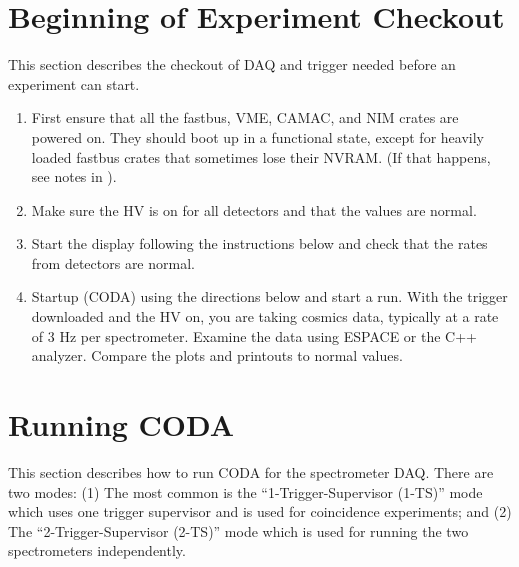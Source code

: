 {\section{Beginning of Experiment Checkout}

\par
This section describes the 
checkout of DAQ and trigger
needed before an experiment can start.

\begin{enumerate}
\item{First ensure that all the fastbus, VME,
CAMAC, and NIM crates are powered
on. They should
boot up in a functional state, except for
heavily loaded fastbus crates that sometimes
lose their NVRAM.  (If that happens, see notes
in ).}


\item{Make sure the HV is on for all detectors
and that the values are normal.}

\item{Start the 
display following the instructions below and
check that the rates from detectors are normal.}
 
\item{Startup  (CODA) using the directions below
and start a run.  With the trigger downloaded
and the HV on, you are taking cosmics data, typically at 
a rate of 3 Hz per spectrometer.  
Examine the data using ESPACE or the C++ analyzer.
Compare the plots and printouts to normal values.}

\end{enumerate}

\section{Running CODA}

\par
This section describes how to run CODA for
the spectrometer DAQ.  There are two modes:
(1) The most common is the ``1-Trigger-Supervisor (1-TS)''
mode which uses one trigger supervisor and
is used for coincidence experiments; and
(2) The ``2-Trigger-Supervisor (2-TS)'' mode which
is used for running the two spectrometers
independently.

}
